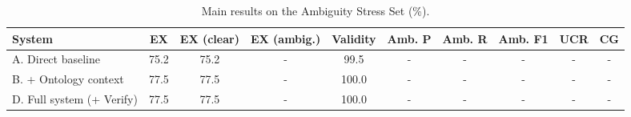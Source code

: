 \begin{table}[t]
\centering
\caption{Main results on the Ambiguity Stress Set (\%).}
\label{tab:main}
\small
\begin{tabular}{lccccccccc}
\hline
System & EX & EX (clear) & EX (ambig.) & Validity & Amb. P & Amb. R & Amb. F1 & UCR & CG \\
\hline
A. Direct baseline & 75.2 & 75.2 & - & 99.5 & - & - & - & - & - \\
B. + Ontology context & 77.5 & 77.5 & - & 100.0 & - & - & - & - & - \\
D. Full system (+ Verify) & 77.5 & 77.5 & - & 100.0 & - & - & - & - & - \\
\hline
\end{tabular}
\end{table}
